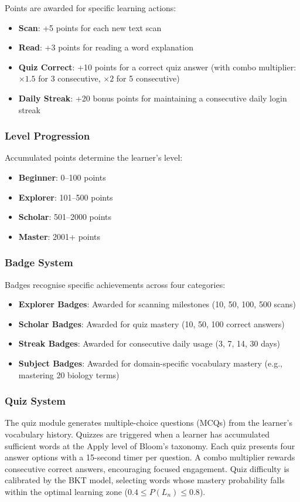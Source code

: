 Points are awarded for specific learning actions:
\begin{itemize}
    \item \textbf{Scan}: +5 points for each new text scan
    \item \textbf{Read}: +3 points for reading a word explanation
    \item \textbf{Quiz Correct}: +10 points for a correct quiz answer (with combo multiplier: $\times 1.5$ for 3 consecutive, $\times 2$ for 5 consecutive)
    \item \textbf{Daily Streak}: +20 bonus points for maintaining a consecutive daily login streak
\end{itemize}

\subsubsection{Level Progression}

Accumulated points determine the learner's level:
\begin{itemize}
    \item \textbf{Beginner}: 0--100 points
    \item \textbf{Explorer}: 101--500 points
    \item \textbf{Scholar}: 501--2000 points
    \item \textbf{Master}: 2001+ points
\end{itemize}

\subsubsection{Badge System}

Badges recognise specific achievements across four categories:
\begin{itemize}
    \item \textbf{Explorer Badges}: Awarded for scanning milestones (10, 50, 100, 500 scans)
    \item \textbf{Scholar Badges}: Awarded for quiz mastery (10, 50, 100 correct answers)
    \item \textbf{Streak Badges}: Awarded for consecutive daily usage (3, 7, 14, 30 days)
    \item \textbf{Subject Badges}: Awarded for domain-specific vocabulary mastery (e.g., mastering 20 biology terms)
\end{itemize}

\subsubsection{Quiz System}

The quiz module generates multiple-choice questions (MCQs) from the learner's vocabulary history. Quizzes are triggered when a learner has accumulated sufficient words at the Apply level of Bloom's taxonomy. Each quiz presents four answer options with a 15-second timer per question. A combo multiplier rewards consecutive correct answers, encouraging focused engagement. Quiz difficulty is calibrated by the BKT model, selecting words whose mastery probability falls within the optimal learning zone ($0.4 \leq P(L_n) \leq 0.8$).
